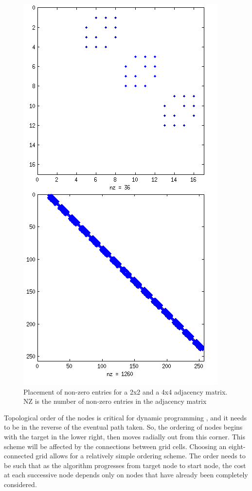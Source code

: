 \documentclass[journal]{IEEEtran}
\begin{document}
\begin{figure}[!h]
\label{speye}
\centering
\includegraphics[scale=0.8]{speye.png}
\caption{Placement of non-zero entries for a 2x2 and a 4x4 adjacency matrix. NZ is the number of non-zero entries in the adjacency matrix}
\label{fig_sim}
\end{figure}

Topological order of the nodes is critical for dynamic programming \cite{(Dynamic Programming book)}, and it needs to be in the reverse of the eventual path taken. 
So, the ordering of nodes begins with the target in the lower right, then moves radially out from this corner. 
This scheme will be affected by the connections between grid cells. 
Choosing an eight-connected grid allows for a relatively simple ordering scheme. 
The order needs to be such that as the algorithm progresses from target node to start node, the cost at each successive node depends only on nodes that have already been completely considered. 
\end{document}
